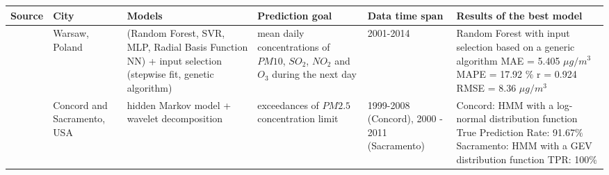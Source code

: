 \begin{landscape}
\begin{table}[htp]
\centering
\footnotesize
\rowstripes
\begin{tabular}{p{}
    |p{}
    |p{}
    |p{}
    |p{}
    |p{}}
\toprule
Source & City & Models & Prediction goal & Data time span & Results of the best model \\ \midrule
\cite{SIWEK2016} & Warsaw, Poland & (Random Forest, SVR, MLP, Radial Basis Function NN) + input selection (stepwise fit, genetic algorithm) & mean daily concentrations of $PM10$, $SO_2$, $NO_2$ and $O_3$ during the next day & 2001-2014 & \makecell[tl]{Random Forest with input\\selection based on\\a generic algorithm\\MAE = 5.405 $\mu g / m^3$\\MAPE = 17.92 $\%$\\r = 0.924\\RMSE = 8.36 $\mu g / m^3$} \\
\cite{SUN201393} & Concord and Sacramento, USA & hidden Markov model + wavelet decomposition & exceedances of $PM2.5$ concentration limit & 1999-2008 (Concord), 2000 - 2011 (Sacramento) & \makecell[tl]{Concord:\\HMM with a log-normal\\distribution function\\True Prediction Rate: 	91.67$\%$\\Sacramento:\\HMM with a GEV distribution\\function\\TPR: 100$\%$} \\
\bottomrule
\end{tabular}
\end{table}
\end{landscape}


